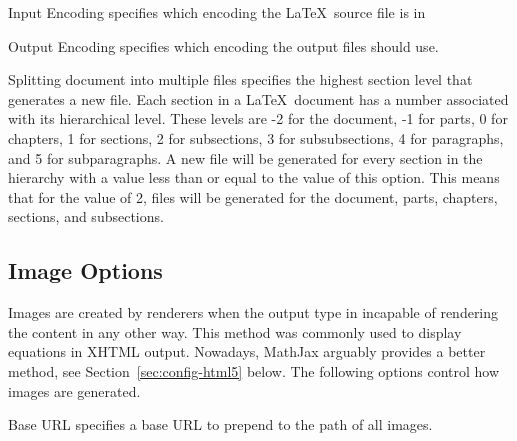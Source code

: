 \begin{configuration}{Input Encoding}
specifies which encoding the \LaTeX\ source file is in
\end{configuration}

\begin{configuration}{Output Encoding}
specifies which encoding the output files should use.
\end{configuration}

\begin{configuration}{Splitting document into multiple files}
specifies the highest section level that generates a new file.  Each section
in a \LaTeX\ document has a number associated with its hierarchical level.
These levels are -2 for the document, -1 for parts, 0 for chapters,
1 for sections, 2 for subsections, 3 for subsubsections, 4 for paragraphs,
and 5 for subparagraphs.  A new file will be generated for every section
in the hierarchy with a value less than or equal to the value of this
option.  This means that for the value of 2, files will be generated for
the document, parts, chapters, sections, and subsections.
\end{configuration}


\subsection{Image Options\label{sec:config-images}}

Images are created by renderers when the output type in incapable of
rendering the content in any other way. This method was commonly used
to display equations in XHTML output. Nowadays, MathJax arguably
provides a better method, see Section~\ref{sec:config-html5} below.
The following options control how images are generated.

\begin{configuration}{Base URL}
specifies a base URL to prepend to the path of all images.
\end{configuration}

